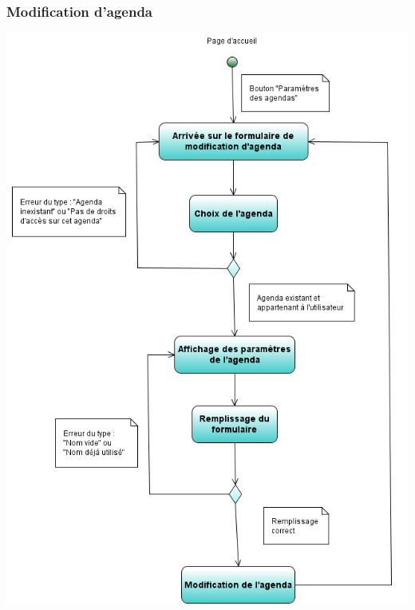\documentclass[12pt , a4paper]{article}
\begin{document}
\subsubsection{Modification d'agenda}
\begin{center}
  \includegraphics[scale=0.6]{./images/diag_act_modification_agenda.png}
\end{center}
\end{document}
